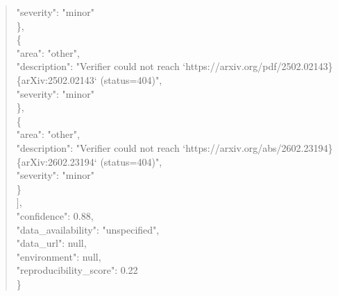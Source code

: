 \documentclass[11pt]{article}
\begin{document}
\begin{quote}
      "severity": "minor"\\
    \},\\
    \{\\
      "area": "other",\\
      "description": "Verifier could not reach `https://arxiv.org/pdf/2502.02143\}\{arXiv:2502.02143` (status=404)",\\
      "severity": "minor"\\
    \},\\
    \{\\
      "area": "other",\\
      "description": "Verifier could not reach `https://arxiv.org/abs/2602.23194\}\{arXiv:2602.23194` (status=404)",\\
      "severity": "minor"\\
    \}\\
  ],\\
  "confidence": 0.88,\\
  "data\_availability": "unspecified",\\
  "data\_url": null,\\
  "environment": null,\\
  "reproducibility\_score": 0.22\\
\}\\
\end{quote}
\end{document}
